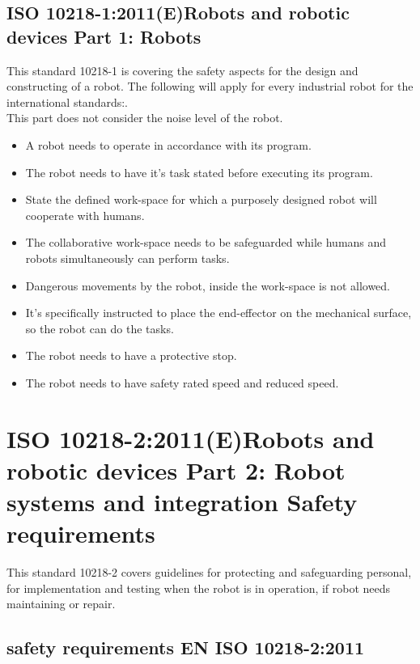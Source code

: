 \subsection{ISO 10218-1:2011(E)Robots and robotic devices Part 1: Robots}
This standard 10218-1 is covering the safety aspects for the design and constructing of a robot.
The following will apply for every industrial robot for the international standards:\cite{Robotterdel1ds}.\\
This part does not consider the noise level of the robot.
\begin{itemize}
    \item A robot needs to operate in accordance with its program.
    \item The robot needs to have it's task stated before executing its program.
    \item State the defined work-space for which a purposely designed robot will cooperate with humans.
    \item The collaborative work-space needs to be safeguarded while humans and robots simultaneously can perform tasks.
    \item Dangerous movements by the robot, inside the work-space is not allowed.
    \item It's specifically instructed to place the end-effector on the mechanical surface, so the robot can do the tasks.
    \item The robot needs to have a protective stop.
    \item The robot needs to have safety rated speed and reduced speed.
\end{itemize}

\section{ISO 10218-2:2011(E)Robots and robotic devices Part 2: Robot systems and integration Safety requirements}\label{ISO2}
This standard 10218-2 covers guidelines for protecting and safeguarding personal, for implementation and testing when the robot is in operation, if robot needs maintaining or repair.

\subsection{safety requirements EN ISO 10218-2:2011}

